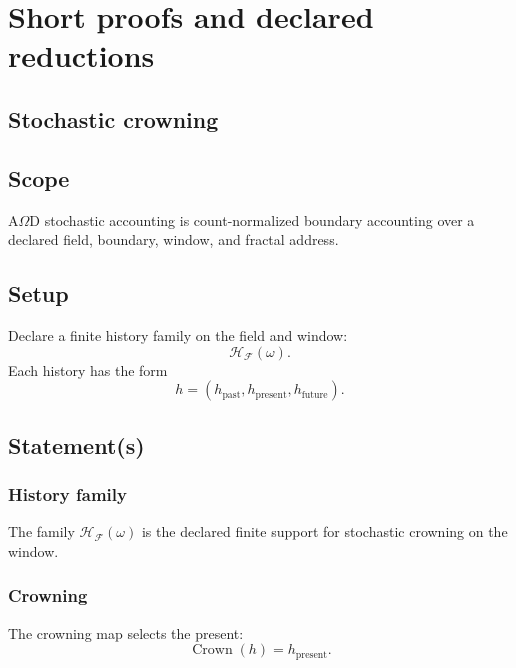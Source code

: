 \section{Short proofs and declared reductions}
\label{app:short-proofs}
\subsection{Stochastic crowning}
\label{app:stochastic-crowning}

\subsection{Scope}
\label{app:stoch-scope}
A\(\Omega\)D stochastic accounting is count-normalized boundary accounting over a declared field, boundary, window, and fractal address.



\subsection{Setup}
\label{app:stoch-setup}
Declare a finite history family on the field and window:
\[
\mathcal H_{\mathcal F}(\omega).
\]
Each history has the form
\[
h=(h_{\mathrm{past}},h_{\mathrm{present}},h_{\mathrm{future}}).
\]

\subsection{Statement(s)}
\label{app:stoch-statements}

\subsubsection{History family}
\label{app:stoch-history-family}
The family \(\mathcal H_{\mathcal F}(\omega)\) is the declared finite support for stochastic crowning on the window.

\subsubsection{Crowning}
\label{app:stoch-crowning}
The crowning map selects the present:
\[
\operatorname{Crown}(h)=h_{\mathrm{present}}.
\]

